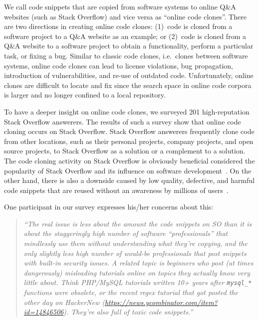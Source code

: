 \documentclass[10pt,journal,compsoc]{IEEEtran}
\begin{document}
We call code snippets that are copied from software systems to online Q\&A
websites (such as Stack Overflow) and vice versa as ``online code clones''.
There are two directions in creating online code clones: (1)~code is cloned from
a software project to a Q\&A website as an example; or (2)~code is cloned from a
Q\&A website to a software project to obtain a functionality, perform a
particular task, or fixing a bug. %
Similar to classic code clones, i.e.~clones between software systems, online
code clones can lead to license violations, bug propagation, introduction of
vulnerabilities, and re-use of outdated code. Unfortunately, online clones are
difficult to locate and fix since the search space in online code corpora is
larger and no longer confined to a local repository.

To have a deeper insight on online code clones, we surveyed 201 high-reputation
Stack Overflow answerers. The results of such a survey show that online code
cloning occurs on Stack Overflow. Stack Overflow answerers frequently clone code
from other locations, such as their personal projects, company projects, and
open source projects, to Stack Overflow as a solution or a complement to a
solution. The code cloning activity on Stack Overflow is obviously beneficial
considered the popularity of Stack Overflow and its influence on software
development~\cite{Ponzanelli2013,Ponzanelli2014,Park2014}. On the other hand,
there is also a downside caused by low quality, defective, and harmful code
snippets that are reused without an awareness by millions of users~\cite{Zhang2018,Acar2016,Fischer2017}.

One participant in our survey expresses his/her concerns about this:

\begin{quote}
	\textit{``The real issue is less about the amount the code snippets
	on SO than it is about the staggeringly high number of software
	``professionals'' that mindlessly use them without understanding what they're
	copying, and the only slightly less high number of would-be professionals that
	post snippets with built-in security issues.  A related topic is beginners who
	post (at times dangerously) misleading tutorials online on topics they actually
	know very little about. Think PHP/MySQL tutorials written 10+ years after
	\texttt{mysql\_*} functions were obsolete, or the recent regex tutorial that
	got posted the other day on HackerNew
	(\url{https://news.ycombinator.com/item?id=14846506}). They're also full of
	toxic code snippets.''}
\end{quote}
\end{document}
